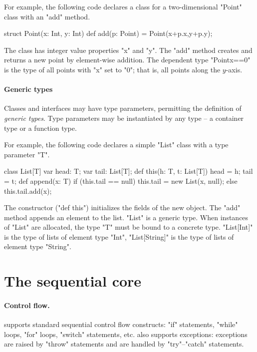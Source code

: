 For example, the following code declares a class for a two-dimensional 
\xcd"Point" class with an \xcd"add" method.
\begin{xten}
struct Point(x: Int, y: Int) {
    def add(p: Point) = Point(x+p.x,y+p.y); 
}
\end{xten}
The class has integer value properties \xcd"x" and \xcd"y".
The \xcd"add" method creates and returns a new point by
element-wise addition.
The dependent type \xcd"Point{x==0}" is the type of all points 
with \xcd"x" set to \xcd"0"; that is, all points along the $y$-axis.

\paragraph{Generic types}

Classes and interfaces may have type parameters, permitting the definition of
{\em generic types}.  Type parameters may be instantiated by any type -- a
container type or a function type. 

For example,
the following code declares a simple \xcd"List" class with a
type parameter \xcd"T".

\begin{xten}
class List[T] {
    var head: T;
    var tail: List[T];
    def this(h: T, t: List[T]) { head = h; tail = t; }
    def append(x: T) {
        if (this.tail == null)
            this.tail = new List(x, null);
        else
            this.tail.add(x);
    }
}
\end{xten}
The constructor (\xcd"def this") initializes the fields of the new object.
The \xcd"add" method appends an element to the list.
\xcd"List" is a generic type.  When  instances of \xcd"List" are
allocated, the type \param{} \xcd"T" must be bound to a concrete
type.  \xcd"List[Int]" is the type of lists of element type
\xcd"Int", \xcd"List[String]" is the type of lists of element
type \xcd"String".

\section{The sequential core}

\paragraph{Control flow.}  \Xten{} supports standard sequential control flow
constructs: \xcd"if" statements, \xcd"while" loops, \xcd"for" loops,
\xcd"switch" statements, etc.  \Xten{} also supports exceptions: exceptions are
raised by \xcd"throw" statements and are handled by \xcd"try"--\xcd"catch"
statements.

